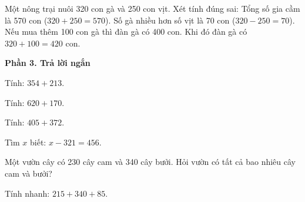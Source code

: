 \begin{ex} %
Một nông trại nuôi 320 con gà và 250 con vịt. Xét tính đúng sai:
\choiceTF
{\True Tổng số gia cầm là 570 con ($320 + 250 = 570$).}
{\True Số gà nhiều hơn số vịt là 70 con ($320 - 250 = 70$).}
{Nếu mua thêm 100 con gà thì đàn gà có 400 con.}
{\True Khi đó đàn gà có $320 + 100 = 420$ con.}
\end{ex}

\textbf{Phần 3. Trả lời ngắn}

\begin{ex} %
Tính: $354 + 213$.
\end{ex}

\begin{ex} %
Tính: $620 + 170$.
\end{ex}

\begin{ex} %
Tính: $405 + 372$.
\end{ex}

\begin{ex} %
Tìm $x$ biết: $x - 321 = 456$.
\end{ex}

\begin{ex} %
Một vườn cây có 230 cây cam và 340 cây bưởi. Hỏi vườn có tất cả bao nhiêu cây cam và bưởi?
\end{ex}

\begin{ex} %
Tính nhanh: $215 + 340 + 85$.
\end{ex}
